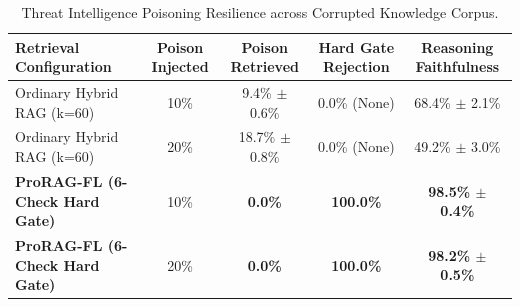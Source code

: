 \begin{table}[t]
\centering
\small
\caption{Threat Intelligence Poisoning Resilience across Corrupted Knowledge Corpus.}
\label{tab:rag_poisoning_robustness}
\begin{tabular}{lcccc}
\toprule
\textbf{Retrieval Configuration} & \textbf{Poison Injected} & \textbf{Poison Retrieved} & \textbf{Hard Gate Rejection} & \textbf{Reasoning Faithfulness} \\
\midrule
Ordinary Hybrid RAG (k=60) & 10\% & 9.4\% $\pm$ 0.6\% & 0.0\% (None) & 68.4\% $\pm$ 2.1\% \\
Ordinary Hybrid RAG (k=60) & 20\% & 18.7\% $\pm$ 0.8\% & 0.0\% (None) & 49.2\% $\pm$ 3.0\% \\
\midrule
\textbf{ProRAG-FL (6-Check Hard Gate)} & 10\% & \textbf{0.0\%} & \textbf{100.0\%} & \textbf{98.5\% $\pm$ 0.4\%} \\
\textbf{ProRAG-FL (6-Check Hard Gate)} & 20\% & \textbf{0.0\%} & \textbf{100.0\%} & \textbf{98.2\% $\pm$ 0.5\%} \\
\bottomrule
\end{tabular}
\end{table}
